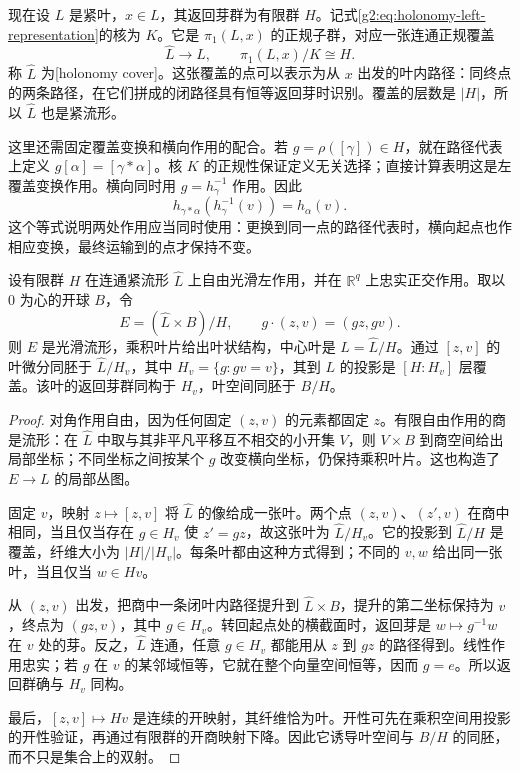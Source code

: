 现在设 \(L\) 是紧叶，\(x\in L\)，其返回芽群为有限群 \(H\)。记式\eqref{g2:eq:holonomy-left-representation}的核为 \(K\)。它是 \(\pi_1(L,x)\) 的正规子群，对应一张连通正规覆盖
\[
	\widehat L\longrightarrow L,\qquad
	\pi_1(L,x)/K\cong H.
\]
称 \(\widehat L\) 为[holonomy cover]。这张覆盖的点可以表示为从 \(x\) 出发的叶内路径：同终点的两条路径，在它们拼成的闭路径具有恒等返回芽时识别。覆盖的层数是 \(|H|\)，所以 \(\widehat L\) 也是紧流形。

\ProseParagraphBreak

这里还需固定覆盖变换和横向作用的配合。若 \(g=\rho([\gamma])\in H\)，就在路径代表上定义 \(g[\alpha]=[\gamma*\alpha]\)。核 \(K\) 的正规性保证定义无关选择；直接计算表明这是左覆盖变换作用。横向同时用 \(g=h_\gamma^{-1}\) 作用。因此
\[
	h_{\gamma*\alpha}(h_\gamma^{-1}(v))=h_\alpha(v).
\]
这个等式说明两处作用应当同时使用：更换到同一点的路径代表时，横向起点也作相应变换，最终运输到的点才保持不变。

\begin{proposition}\label{g2:prop:finite-holonomy-model}
	设有限群 \(H\) 在连通紧流形 \(\widehat L\) 上自由光滑左作用，并在 \(\mathbb R^q\) 上忠实正交作用。取以 \(0\) 为心的开球 \(B\)，令
	\begin{equation}\label{g2:eq:finite-holonomy-model}
		E=(\widehat L\times B)/H,\qquad
		g\cdot(z,v)=(gz,gv).
	\end{equation}
	则 \(E\) 是光滑流形，乘积叶片给出叶状结构，中心叶是 \(L=\widehat L/H\)。通过 \([z,v]\) 的叶微分同胚于 \(\widehat L/H_v\)，其中 \(H_v=\{g:gv=v\}\)，其到 \(L\) 的投影是 \([H:H_v]\) 层覆盖。该叶的返回芽群同构于 \(H_v\)，叶空间同胚于 \(B/H\)。
\end{proposition}
\begin{proof}
	对角作用自由，因为任何固定 \((z,v)\) 的元素都固定 \(z\)。有限自由作用的商是流形：在 \(\widehat L\) 中取与其非平凡平移互不相交的小开集 \(V\)，则 \(V\times B\) 到商空间给出局部坐标；不同坐标之间按某个 \(g\) 改变横向坐标，仍保持乘积叶片。这也构造了 \(E\to L\) 的局部丛图。

	固定 \(v\)，映射 \(z\mapsto[z,v]\) 将 \(\widehat L\) 的像给成一张叶。两个点 \((z,v)\)、\((z',v)\) 在商中相同，当且仅当存在 \(g\in H_v\) 使 \(z'=gz\)，故这张叶为 \(\widehat L/H_v\)。它的投影到 \(\widehat L/H\) 是覆盖，纤维大小为 \(|H|/|H_v|\)。每条叶都由这种方式得到；不同的 \(v,w\) 给出同一张叶，当且仅当 \(w\in Hv\)。

	从 \((z,v)\) 出发，把商中一条闭叶内路径提升到 \(\widehat L\times B\)，提升的第二坐标保持为 \(v\)，终点为 \((gz,v)\)，其中 \(g\in H_v\)。转回起点处的横截面时，返回芽是 \(w\mapsto g^{-1}w\) 在 \(v\) 处的芽。反之，\(\widehat L\) 连通，任意 \(g\in H_v\) 都能用从 \(z\) 到 \(gz\) 的路径得到。线性作用忠实；若 \(g\) 在 \(v\) 的某邻域恒等，它就在整个向量空间恒等，因而 \(g=e\)。所以返回群确与 \(H_v\) 同构。

	最后，\([z,v]\mapsto Hv\) 是连续的开映射，其纤维恰为叶。开性可先在乘积空间用投影的开性验证，再通过有限群的开商映射下降。因此它诱导叶空间与 \(B/H\) 的同胚，而不只是集合上的双射。
\end{proof}

